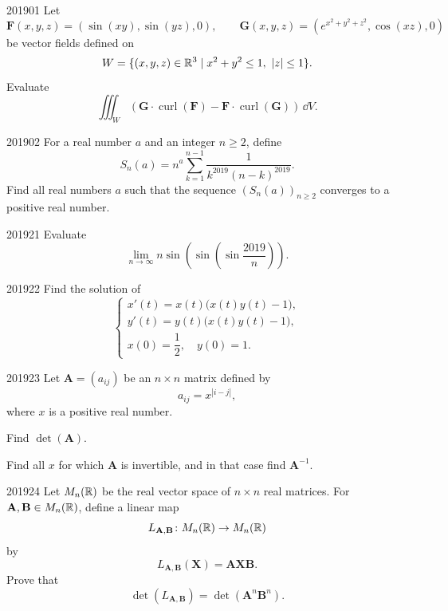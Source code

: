 
\begin{problem}{2019}{0}{1}
Let
\[
    \mathbf F(x, y, z)=(\sin(xy), \sin(yz), 0),
    \qquad
    \mathbf G(x, y, z)=(e^{x^2+y^2+z^2}, \cos(xz), 0)
\]
be vector fields defined on
\[
    W=\{(x, y, z)\in\mathbb{R}^3\mid x^2+y^2\le1, \ |z|\le1\}.
\]
Evaluate
\[
    \iiint_W
    \left(
        \mathbf G\cdot\operatorname{curl}(\mathbf F)
        -\mathbf F\cdot\operatorname{curl}(\mathbf G)
    \right)\, \dd V.
\]
\end{problem}

\begin{problem}{2019}{0}{2}
For a real number $a$ and an integer $n\ge2$, define
\[
    S_n(a)
    =n^a\sum_{k=1}^{n-1}
    \frac{1}{k^{2019}(n-k)^{2019}}.
\]
Find all real numbers $a$ such that the sequence $(S_n(a))_{n\ge2}$ converges to a positive real number.
\end{problem}

\begin{problem}{2019}{2}{1}
Evaluate
\[
    \lim_{n\to\infty}
    n\sin\left(
        \sin\left(
            \sin\frac{2019}{n}
        \right)
    \right).
\]
\end{problem}

\begin{problem}{2019}{2}{2}
Find the solution of
\[
\begin{cases}
    x'(t)=x(t)\bigl(x(t)y(t)-1\bigr), \\
    y'(t)=y(t)\bigl(x(t)y(t)-1\bigr), \\
    x(0)=\dfrac12, \quad y(0)=1.
\end{cases}
\]
\end{problem}

\begin{problem}{2019}{2}{3}
Let $\mathbf A=(a_{ij})$ be an $n\times n$ matrix defined by
\[
    a_{ij}=x^{|i-j|},
\]
where $x$ is a positive real number.
\begin{problemsubparts}
    \item Find $\det(\mathbf A)$.
    \item Find all $x$ for which $\mathbf A$ is invertible, and in that case find $\mathbf A^{-1}$.
\end{problemsubparts}
\end{problem}

\begin{problem}{2019}{2}{4}
Let $M_n(\mathbb{R})$ be the real vector space of $n\times n$ real matrices. For $\mathbf A, \mathbf B\in M_n(\mathbb{R})$, define a linear map
\[
    L_{\mathbf A, \mathbf B}\colon M_n(\mathbb{R})\to M_n(\mathbb{R})
\]
by
\[
    L_{\mathbf A, \mathbf B}(\mathbf X)=\mathbf A\mathbf X\mathbf B.
\]
Prove that
\[
    \det(L_{\mathbf A, \mathbf B})
    =\det(\mathbf A^n\mathbf B^n).
\]
\end{problem}

